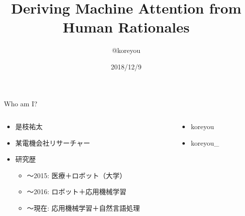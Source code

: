 

\title{Deriving Machine Attention from Human Rationales}
\author{@koreyou}
\date[]{2018/12/9}




\frame{\titlepage}

\begin{frame}{Who am I?}
  \begin{columns}[onlytextwidth]
  \begin{column}{0.68\linewidth}
    \begin{itemize}
      \item 是枝祐太
      \item 某電機会社リサーチャー
      \item 研究歴
      \begin{itemize}
        \item 〜2015: 医療＋ロボット（大学）
        \item 〜2016: ロボット＋応用機械学習
        \item 〜現在: \alert{応用機械学習＋自然言語処理}
      \end{itemize}
    \end{itemize}
  \end{column}
  \begin{column}{0.3\linewidth}
    \begin{itemize}
      \item[]  koreyou
      \item[]  koreyou\_
    \end{itemize}
    \vspace*{10mm}
  \end{column}
  \end{columns}
\end{frame}

